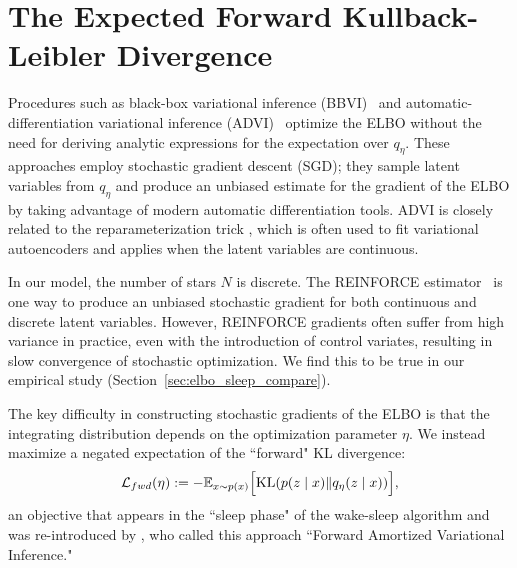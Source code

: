 \section{The Expected Forward Kullback-Leibler Divergence}
\label{sec:wake_sleep}


Procedures such as black-box variational inference (BBVI)~\citep{ranganath2013black} and
automatic-differentiation variational inference (ADVI)~\citep{kucukelbir2016automatic}
optimize the ELBO  without the need for
deriving analytic expressions for the expectation over $q_\eta$.
These approaches employ stochastic gradient descent (SGD);
they sample latent variables from $q_\eta$ and produce an unbiased estimate for the gradient of the ELBO by taking advantage of modern automatic differentiation tools.
ADVI is closely related to the reparameterization trick \citep{SpallOptimization2003,kingma2013autoencoding, rezende2014stochastic}, which is often used to fit variational autoencoders and applies when the latent variables are continuous.

In our model, the number of stars $N$ is discrete.
The REINFORCE estimator~\citep{Williams1992reinforce} is one way to produce an unbiased stochastic gradient for both continuous and discrete latent variables.
However, REINFORCE gradients often suffer from high variance in practice, even with the introduction of control variates, resulting in slow convergence of stochastic optimization. We find this to be true in our empirical study (Section~\ref{sec:elbo_sleep_compare}).

The key difficulty in constructing stochastic gradients of the ELBO is that the
integrating distribution depends on the optimization parameter $\eta$.
We instead maximize a negated expectation of the ``forward" KL divergence:
\begin{align}
    \mathcal{L}_{fwd}(\eta) :=
    - \mathbb{E}_{x \sim p(x)}\Big[\textrm{KL}(p(z \mid x) \| q_\eta(z \mid x))\Big]
    \label{eq:sleep_obj},
\end{align}
an objective that appears in the ``sleep phase" of the wake-sleep algorithm
\citep{Hinton1995wake_sleep, bornschein2014reweighted,le2020revisiting}
and was re-introduced by \cite{ambrogioni2019favi}, who called this approach ``Forward Amortized Variational Inference."

